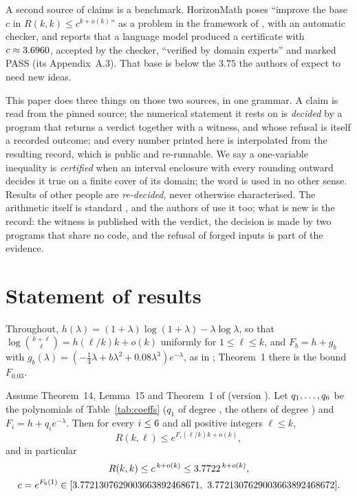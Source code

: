 \documentclass[11pt]{article}
\begin{document}
A second source of claims is a benchmark. HorizonMath \cite{HM} poses ``improve the base $c$ in $R(k,k)\le c^{k+o(k)}$'' as a problem in the framework of \cite{GNNW}, with an automatic checker, and reports that a language model produced a certificate with $c\approx3.6960$, accepted by the checker, ``verified by domain experts'' and marked PASS (its Appendix~A.3). That base is below the $3.75$ the authors of \cite{GNNW} expect to need new ideas.

This paper does three things on those two sources, in one grammar. A claim is read from the pinned source; the numerical statement it rests on is \emph{decided} by a program that returns a verdict together with a witness, and whose refusal is itself a recorded outcome; and every number printed here is interpolated from the resulting record, which is public and re-runnable. We say a one-variable inequality is \emph{certified} when an interval enclosure with every rounding outward decides it true on a finite cover of its domain; the word is used in no other sense. Results of other people are \emph{re-decided}, never otherwise characterised. The arithmetic itself is standard \cite{Moore,Tucker}, and the authors of \cite{GNNW} use it too; what is new is the record: the witness is published with the verdict, the decision is made by two programs that share no code, and the refusal of forged inputs is part of the evidence.

\section{Statement of results}

Throughout, $h(\lambda)=(1+\lambda)\log(1+\lambda)-\lambda\log\lambda$, so that $\log\binom{k+\ell}{\ell}=h(\ell/k)k+o(k)$ uniformly for $1\le\ell\le k$, and $F_b=h+g_b$ with $g_b(\lambda)=(-\tfrac14\lambda+b\lambda^2+0.08\lambda^3)e^{-\lambda}$, as in \cite{GNNW}; Theorem~1 there is the bound $F_{0.03}$.

\begin{theorem}[conditional]\label{thm:chain}
Assume Theorem~14, Lemma~15 and Theorem~1 of \cite{GNNW} (version \GnnwArxiv). Let $q_1,\dots,q_{6}$ be the polynomials of Table~\ref{tab:coeffs} ($q_1$ of degree \DegOne{}, the others of degree \DegNew{}) and $F_i=h+q_ie^{-\lambda}$. Then for every $i\le6$ and all positive integers $\ell\le k$,
\[
R(k,\ell)\le e^{F_i(\ell/k)k+o(k)},
\]
and in particular
\begin{gather*}
R(k,k)\le c^{\,k+o(k)}\le3.7722^{\,k+o(k)},\\
c=e^{F_{6}(1)}\in[3.7721307629003663892468671,\ 3.7721307629003663892468672].
\end{gather*}
\end{theorem}
\end{document}
